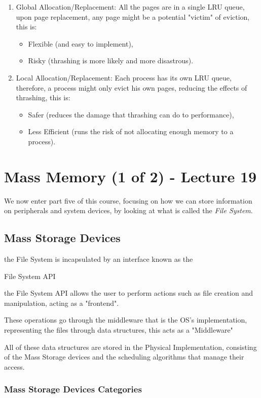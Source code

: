 \documentclass[openright, twoside]{report}
\theoremstyle{definition}
\theoremstyle{example}
\begin{document}
\begin{enumerate}
	\item Global Allocation/Replacement: All the pages are in a single LRU queue, 
	upon page replacement, any page might be a potential "victim" of eviction, this is:
	\begin{itemize}
		\item Flexible (and easy to implement),
		\item Risky (thrashing is more likely and more disastrous).
	\end{itemize}
	\item Local Allocation/Replacement: Each process has its own LRU queue, therefore, 
	a process might only evict his own pages, reducing the effects of thrashing, this is:
	\begin{itemize}
		\item Safer (reduces the damage that thrashing can do to performance),
		\item Less Efficient (runs the risk of not allocating enough memory to a process).
	\end{itemize}
\end{enumerate}


\chapter{Mass Memory (1 of 2) - Lecture 19}
We now enter part five of this course, focusing on how we can store information 
on peripherals and system devices, by looking at what is called the \emph{File System}.
\section{Mass Storage Devices}
the File System is incapsulated by an interface known as the 
\begin{center}
	File System API
\end{center}
the File System API allows the user to perform actions such as file 
creation and manipulation, acting as a "frontend".

These operations go through the middleware that is the OS's implementation, representing 
the files through data structures, this acts as a "Middleware" 

All of these data structures are stored in the Physical Implementation, consisting of 
the Mass Storage devices and the scheduling algorithms that manage their access.

\subsection{Mass Storage Devices Categories}
\end{document}
